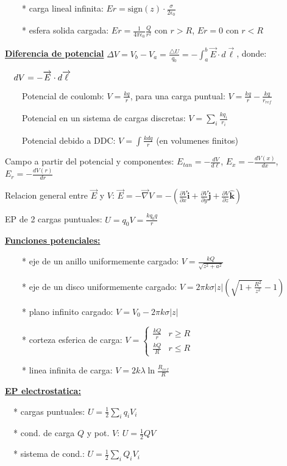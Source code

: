 \documentclass[12pt]{article}
\begin{document}
$\qquad${*} carga lineal infinita: $Er=\textrm{sign}(z)\cdot\frac{\sigma}{2\epsilon_{0}}$

$\qquad${*} esfera solida cargada: $Er=\frac{1}{4\pi\epsilon_{0}}\frac{Q}{r^{2}}$
con $r>R$, $Er=0$ con $r<R$

\textbf{\underline{Diferencia de potencial}} $\Delta V=V_{b}-V_{a}=\frac{\triangle U}{q_{0}}=-\int_{a}^{b}\overrightarrow{E}\cdot d\overrightarrow{\ell}$, donde:

$\quad$$dV=-\overrightarrow{E}\cdot d\overrightarrow{\text{\ensuremath{\ell}}}$

$\qquad$Potencial de coulomb: $V=\frac{kq}{r}$, para una carga puntual: $V=\frac{kq}{r}-\frac{kq}{r_{ref}}$

$\qquad$Potencial en un sistema de cargas discretas: $V=\underset{i}{\sum}\frac{kq_{i}}{r_{i}}$

$\qquad$Potencial debido a DDC: $V=\int\frac{kdq}{r}$ (en volumenes finitos)

Campo a partir del potencial y componentes: $E_{tan}=-\frac{dV}{d\ell}$,
$E_{x}=-\frac{dV(x)}{dx}$, $E_{r}=-\frac{dV(r)}{dr}$

Relacion general entre $\overrightarrow{E}$ y $V$: $\overrightarrow{E}=-\overrightarrow{\nabla}V=-(\frac{\partial V}{\partial x}\hat{\boldsymbol{i}}+\frac{\partial V}{\partial y}\hat{\boldsymbol{j}}+\frac{\partial V}{\partial z}\hat{\boldsymbol{k}})$

EP de 2 cargas puntuales: $U=q_{0}V=\frac{kq_{0}q}{r}$

\textbf{\underline{Funciones potenciales:}}

$\qquad${*} eje de un anillo uniformemente cargado: $V=\frac{kQ}{\sqrt{z^{2}+a^{2}}}$

$\qquad${*} eje de un disco uniformemente cargado: $V=2\pi k\sigma\left|z\right|\left(\sqrt{1+\frac{R^{2}}{z^{2}}}-1\right)$

$\qquad${*} plano infinito cargado: $V=V_{0}-2\pi k\sigma\left|z\right|$

$\qquad${*} corteza esferica de carga: $V=\begin{cases}
\frac{kQ}{r} & r\geq R\\
\frac{kQ}{R} & r\leq R
\end{cases}$

$\qquad${*} linea infinita de carga: $V=2k\lambda\ln\frac{R_{ref}}{R}$

\textbf{\underline{EP electrostatica:}}

$\quad${*} cargas puntuales: $U=\frac{1}{2}\underset{i}{\sum}q_{i}V_{i}$ 

$\quad${*} cond. de carga $Q$ y pot. $V$: $U=\frac{1}{2}QV$ 

$\quad${*} sistema de cond.: $U=\frac{1}{2}\underset{i}{\sum}Q_{i}V_{i}$
\end{document}
